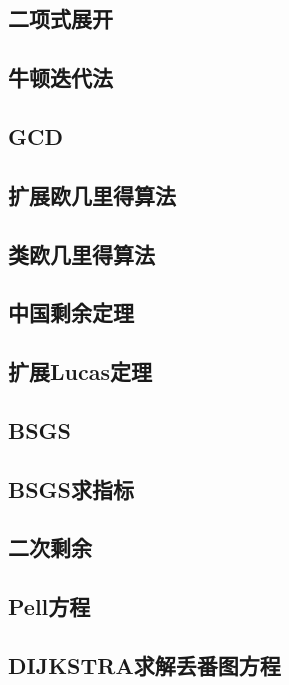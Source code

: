 \documentclass{article}
\begin{document}
\subsection{二项式展开} 

\subsection{牛顿迭代法} 


\subsection{GCD} 

\subsection{扩展欧几里得算法} 

\subsection{类欧几里得算法} 

\subsection{中国剩余定理} 

\subsection{扩展Lucas定理} 

\subsection{BSGS} 

\subsection{BSGS求指标} 

\subsection{二次剩余} 

\subsection{Pell方程} 

\subsection{DIJKSTRA求解丢番图方程} 

\end{document}
